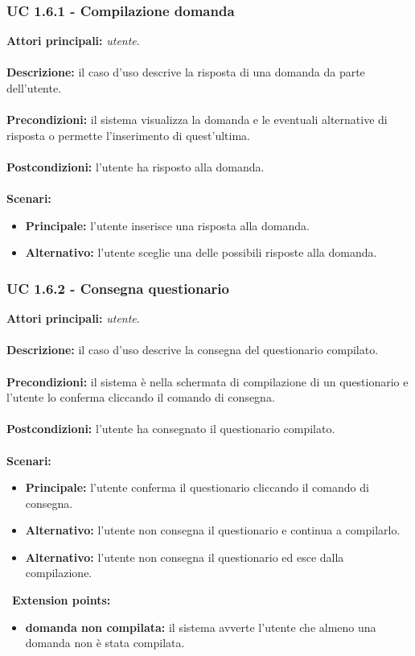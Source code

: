 \documentclass[a4paper,11pt]{article}
\begin{document}
\subsubsection{UC 1.6.1 - Compilazione domanda}

\textbf{Attori principali:} \textit{utente}.\\
\\
\textbf{Descrizione:} il caso d'uso descrive la risposta di una domanda da parte dell'utente. \\
\\
\textbf{Precondizioni:} il sistema visualizza la domanda e le eventuali alternative di risposta o permette l'inserimento di quest'ultima.\\
\\
\textbf{Postcondizioni:} l'utente ha risposto alla domanda. \\
\\
\textbf{Scenari:}
\begin{itemize}
\item \textbf{Principale:} l'utente inserisce una risposta alla domanda.
\item \textbf{Alternativo:} l'utente sceglie una delle possibili risposte alla domanda.\\ 
\end{itemize}
\vspace{6 mm}
\subsubsection{UC 1.6.2 - Consegna questionario}

\textbf{Attori principali:} \textit{utente}.\\
\\
\textbf{Descrizione:} il caso d'uso descrive la consegna del questionario compilato. \\
\\
\textbf{Precondizioni:} il sistema è nella schermata di compilazione di un questionario e l'utente lo conferma cliccando il comando di consegna.\\
\\
\textbf{Postcondizioni:} l'utente ha consegnato il questionario compilato. \\
\\
\textbf{Scenari:}
\begin{itemize}
\item \textbf{Principale:} l'utente conferma il questionario cliccando il comando di consegna.
\item \textbf{Alternativo:} l'utente non consegna il questionario e continua a compilarlo. \\
\item \textbf{Alternativo:} l'utente non consegna il questionario ed esce dalla compilazione.\\ 
\end{itemize}
\
\textbf{Extension points:}
\begin{itemize}
\item \textbf{domanda non compilata:} il sistema avverte l'utente che almeno una domanda non è stata compilata.
\end{itemize}
\vspace{6 mm}
\end{document}
